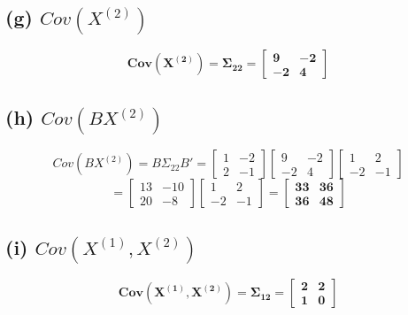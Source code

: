 \documentclass[11pt]{article}
\begin{document}
\subsection*{(g) $Cov(X^{(2)})$}
\[
\mathbf{Cov(X^{(2)}) = \Sigma_{22} = \begin{bmatrix} 9 & -2 \\ -2 & 4 \end{bmatrix}}
\]

\subsection*{(h) $Cov(BX^{(2)})$}
\[
Cov(BX^{(2)}) = B \Sigma_{22} B' 
= \begin{bmatrix} 1 & -2 \\ 2 & -1 \end{bmatrix} \begin{bmatrix} 9 & -2 \\ -2 & 4 \end{bmatrix} \begin{bmatrix} 1 & 2 \\ -2 & -1 \end{bmatrix}
\]
\[
= \begin{bmatrix} 13 & -10 \\ 20 & -8 \end{bmatrix} \begin{bmatrix} 1 & 2 \\ -2 & -1 \end{bmatrix}
= \mathbf{\begin{bmatrix} 33 & 36 \\ 36 & 48 \end{bmatrix}}
\]

\subsection*{(i) $Cov(X^{(1)}, X^{(2)})$}
\[
\mathbf{Cov(X^{(1)}, X^{(2)}) = \Sigma_{12} = \begin{bmatrix} 2 & 2 \\ 1 & 0 \end{bmatrix}}
\]
\end{document}
